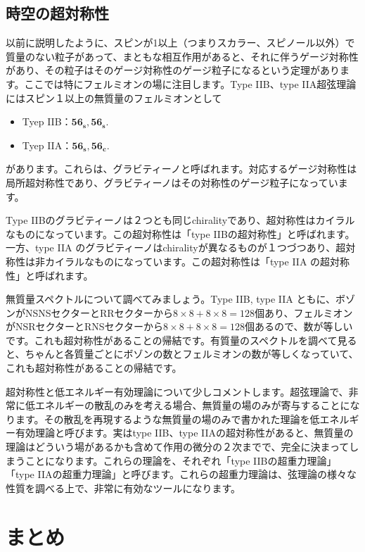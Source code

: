 \documentclass[report,paper=a4, fontsize=12pt, line_length=16cm, number_of_lines=33,dvipdfmx]{jlreq}
\numberwithin{equation}{chapter}
\numberwithin{equation}{section}
\newcommand{\fsxs}{\mathbf{56_s}}
\newcommand{\fsxc}{\mathbf{56_c}}
\begin{document}
\subsection{時空の超対称性}
以前に説明したように、スピンが1以上（つまりスカラー、スピノール以外）で質量のない粒子があって、まともな相互作用があると、それに伴うゲージ対称性があり、その粒子はそのゲージ対称性のゲージ粒子になるという定理があります。ここでは特にフェルミオンの場に注目します。Type IIB、type IIA超弦理論にはスピン１以上の無質量のフェルミオンとして
\begin{itemize}
  \item Tyep IIB：$\fsxs,\fsxs$.
  \item Tyep IIA：$\fsxs,\fsxc$.
\end{itemize}
があります。これらは、グラビティーノと呼ばれます。対応するゲージ対称性は局所超対称性であり、グラビティーノはその対称性のゲージ粒子になっています。

Type IIBのグラビティーノは２つとも同じchiralityであり、超対称性はカイラルなものになっています。この超対称性は「type IIBの超対称性」と呼ばれます。一方、type IIA のグラビティーノはchiralityが異なるものが１つづつあり、超対称性は非カイラルなものになっています。この超対称性は「type IIA の超対称性」と呼ばれます。

無質量スペクトルについて調べてみましょう。Type IIB, type IIA ともに、ボゾンがNSNSセクターとRRセクターから$8\times 8+8\times 8=128$個あり、フェルミオンがNSRセクターとRNSセクターから$8\times 8+8\times 8=128$個あるので、数が等しいです。これも超対称性があることの帰結です。有質量のスペクトルを調べて見ると、ちゃんと各質量ごとにボゾンの数とフェルミオンの数が等しくなっていて、これも超対称性があることの帰結です。

超対称性と低エネルギー有効理論について少しコメントします。超弦理論で、非常に低エネルギーの散乱のみを考える場合、無質量の場のみが寄与することになります。その散乱を再現するような無質量の場のみで書かれた理論を低エネルギー有効理論と呼びます。実はtype IIB、type IIAの超対称性があると、無質量の理論はどういう場があるかも含めて作用の微分の２次までで、完全に決まってしまうことになります。これらの理論を、それぞれ「type IIBの超重力理論」「type IIAの超重力理論」と呼びます。これらの超重力理論は、弦理論の様々な性質を調べる上で、非常に有効なツールになります。

\section{まとめ}
\end{document}
